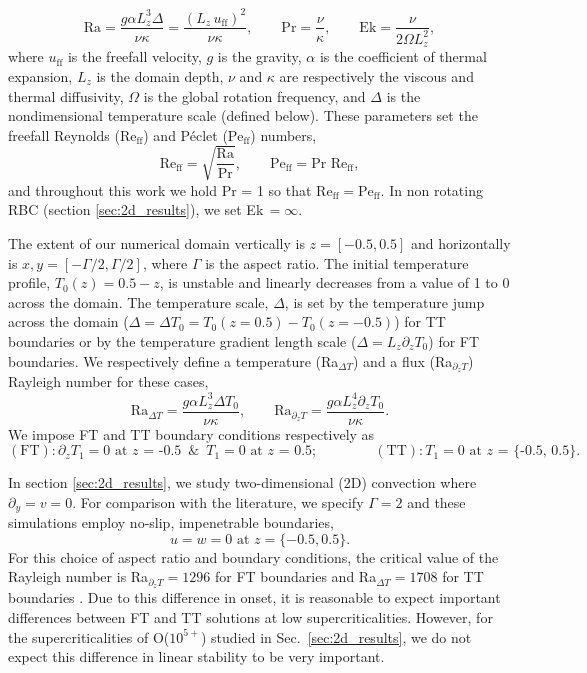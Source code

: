 \documentclass[aps, pre, onecolumn, nofootinbib, notitlepage, groupedaddress, amsfonts, amssymb, amsmath, longbibliography, superscriptaddress]{revtex4-1}
\newcommand{\Reff}{\ensuremath{\text{Re}_{\text{ff}}}}
\newcommand{\Peff}{\ensuremath{\text{Pe}_{\text{ff}}}}
\newcommand{\ea}[1]{{\color{red} #1}}
\begin{document}
\begin{equation}
\text{Ra} = \frac{g \alpha L_z^3 \Delta}{\nu\kappa} = \frac{(L_z\,u_{\text{ff}})^2}{\nu\kappa}, \qquad \text{Pr} = \frac{\nu}{\kappa}, \qquad \text{Ek} = \frac{\nu}{2\Omega L_z^2},
\end{equation}
where $u_{\text{ff}}$ is the freefall velocity, $g$ is the gravity, $\alpha$ is the coefficient of thermal expansion, $L_z$ is the domain depth, $\nu$ and $\kappa$ are respectively the viscous and thermal diffusivity, $\Omega$ is the global rotation frequency, and $\Delta$ is the nondimensional temperature scale (defined below).
These parameters set the freefall Reynolds (\Reff) and P\'{e}clet (\Peff) numbers, 
\begin{equation}
\Reff = \sqrt{\frac{\text{Ra}}{\text{Pr}}},\qquad
\Peff = \text{Pr }\Reff,
\end{equation}
and throughout this work we hold Pr = 1 so that $\Reff = \Peff$.
In non rotating RBC (section \ref{sec:2d_results}), we set Ek$\,= \infty$.

The extent of our numerical domain vertically is $z = [-0.5, 0.5]$ and horizontally is $x, y = [-\Gamma/2, \Gamma/2]$, where $\Gamma$ is the aspect ratio.
The initial temperature profile, $T_0(z) = 0.5 - z$, is unstable and linearly decreases from a value of 1 to 0 across the domain. 
The temperature scale, $\Delta$, is set by the temperature jump across the domain ($\Delta = \Delta T_0 =  T_0(z=0.5)-T_0(z=-0.5)$) for TT boundaries or by the temperature gradient length scale ($\Delta = L_z \partial_z T_0$) for FT boundaries.
We respectively define a temperature (Ra$_{\Delta T}$) and a flux (Ra$_{\partial_z T}$) Rayleigh number for these cases,
\begin{equation}
\text{Ra}_{\Delta T} = \frac{g \alpha L_z^3 \Delta T_0}{\nu\kappa}, \qquad 
\text{Ra}_{\partial_z T} = \frac{g \alpha L_z^4 \partial_z T_0}{\nu\kappa}.
\end{equation}
We impose FT and TT boundary conditions respectively as
\begin{equation}
(\text{FT}): \partial_z T_1 = 0 \text{ at $z$ = -0.5} \,\,\,\&\,\,\, T_1 = 0 \text{ at $z$ = 0.5};\qquad\qquad
(\text{TT}): T_1 = 0 \text{ at $z$ = \{-0.5, 0.5\}}.
\end{equation}

In section \ref{sec:2d_results}, we study two-dimensional (2D) convection where $\partial_y = v = 0$.
For comparison with the literature, we specify $\Gamma = 2$ and these simulations employ no-slip, impenetrable boundaries,
\begin{equation}
u = w = 0 \, \, \text{at}\,\,z = \{-0.5, 0.5\}.
\label{eqn:vel_bcs}
\end{equation}
For this choice of \ea{aspect ratio and} boundary conditions, the critical value of the Rayleigh number is Ra$_{\partial_z T} = 1296$ for FT boundaries and Ra$_{\Delta T} = 1708$ for TT boundaries \cite{goluskin2016}.
Due to this difference in onset, it is reasonable to expect important differences between FT and TT solutions at low supercriticalities.
However, for the supercriticalities of O($10^{5+}$) studied in Sec.~\ref{sec:2d_results}, we do not expect this difference in linear stability to be very important.
\end{document}
